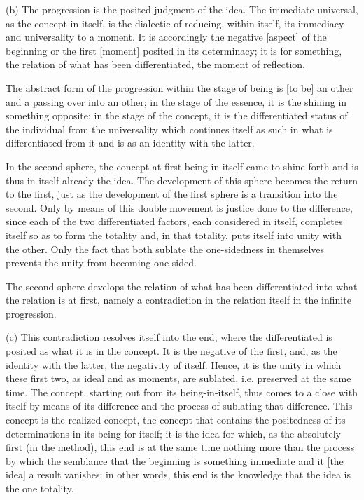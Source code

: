 (b) The progression is the posited judgment of the idea.
The immediate universal, as the concept in itself,
is the dialectic of reducing, within itself,
its immediacy and universality to a moment.
It is accordingly the negative [aspect] of the beginning
or the first [moment] posited in its determinacy;
it is for something,
the relation of what has been differentiated,
the moment of reflection.

The abstract form of the progression
within the stage of being is
[to be] an other and a passing over into an other;
in the stage of the essence,
it is the shining in something opposite;
in the stage of the concept,
it is the differentiated status of
the individual from the universality
which continues itself as such in
what is differentiated from it
and is as an identity with the latter.

In the second sphere, the concept at first
being in itself came to shine forth
and is thus in itself already the idea.
The development of this sphere becomes
the return to the first,
just as the development of the first sphere is
a transition into the second.
Only by means of this double movement is
justice done to the difference,
since each of the two differentiated factors,
each considered in itself,
completes itself so as to form the totality
and, in that totality,
puts itself into unity with the other.
Only the fact that both sublate the one-sidedness
in themselves prevents the unity from becoming one-sided.

The second sphere develops the relation of
what has been differentiated
into what the relation is at first,
namely a contradiction in the relation itself
in the infinite progression.

(c) This contradiction resolves itself into the end,
where the differentiated is posited as what it is in the concept.
It is the negative of the first,
and, as the identity with the latter,
the negativity of itself.
Hence, it is the unity
in which these first two,
as ideal and as moments,
are sublated, i.e. preserved at the same time.
The concept, starting out from its being-in-itself,
thus comes to a close with itself
by means of its difference
and the process of sublating that difference.
This concept is the realized concept,
the concept that contains the positedness
of its determinations in its being-for-itself;
it is the idea for which, as the absolutely first (in the method),
this end is at the same time
nothing more than the process
by which the semblance that
the beginning is something immediate
and it [the idea] a result vanishes;
in other words, this end is the knowledge
that the idea is the one totality.

